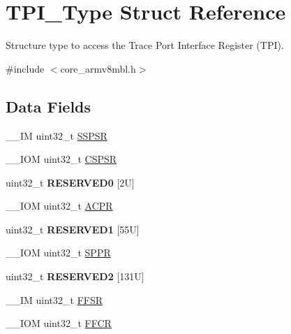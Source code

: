 \hypertarget{struct_t_p_i___type}{}\section{T\+P\+I\+\_\+\+Type Struct Reference}
\label{struct_t_p_i___type}


Structure type to access the Trace Port Interface Register (T\+PI).  




{\ttfamily \#include $<$core\+\_\+armv8mbl.\+h$>$}

\subsection*{Data Fields}
\begin{DoxyCompactItemize}
\item 
\+\_\+\+\_\+\+IM uint32\+\_\+t \hyperlink{struct_t_p_i___type_a037901d7cb870199ac51d9ad0ef9fd1a}{S\+S\+P\+SR}
\item 
\+\_\+\+\_\+\+I\+OM uint32\+\_\+t \hyperlink{struct_t_p_i___type_a8826aa84e5806053395a742d38d59d0f}{C\+S\+P\+SR}
\item 
\mbox{\label{struct_t_p_i___type_a409fb08ad6d58c17fcb7f59d65db6f93}} 
uint32\+\_\+t {\bfseries R\+E\+S\+E\+R\+V\+E\+D0} \mbox{[}2\+U\mbox{]}
\item 
\+\_\+\+\_\+\+I\+OM uint32\+\_\+t \hyperlink{struct_t_p_i___type_a9e5e4421ef9c3d5b7ff8b24abd4e99b3}{A\+C\+PR}
\item 
\mbox{\label{struct_t_p_i___type_abc2f542560b78ccbbf0a44aadb5651fb}} 
uint32\+\_\+t {\bfseries R\+E\+S\+E\+R\+V\+E\+D1} \mbox{[}55\+U\mbox{]}
\item 
\+\_\+\+\_\+\+I\+OM uint32\+\_\+t \hyperlink{struct_t_p_i___type_a12f79d4e3ddc69893ba8bff890d04cc5}{S\+P\+PR}
\item 
\mbox{\label{struct_t_p_i___type_ae6a238467f129df7440d97de8b58fe03}} 
uint32\+\_\+t {\bfseries R\+E\+S\+E\+R\+V\+E\+D2} \mbox{[}131\+U\mbox{]}
\item 
\+\_\+\+\_\+\+IM uint32\+\_\+t \hyperlink{struct_t_p_i___type_a6c47a0b4c7ffc66093ef993d36bb441c}{F\+F\+SR}
\item 
\+\_\+\+\_\+\+I\+OM uint32\+\_\+t \hyperlink{struct_t_p_i___type_a3f68b6e73561b4849ebf953a894df8d2}{F\+F\+CR}
\item 

\end{DoxyCompactItemize}
